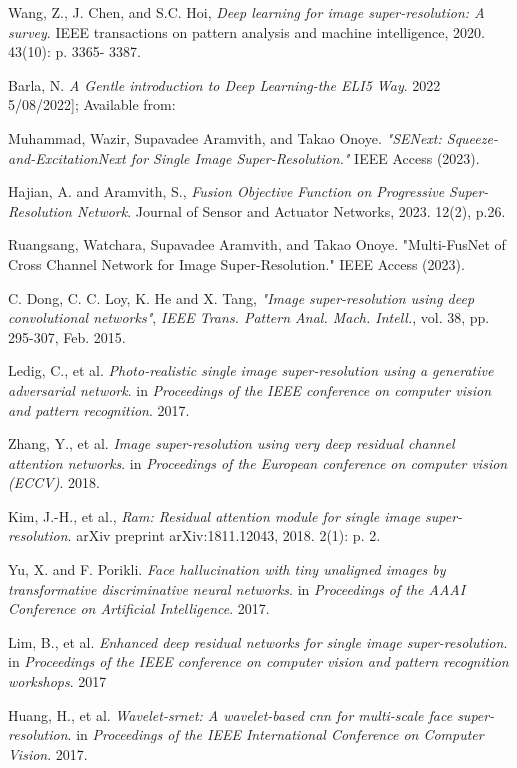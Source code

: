 \documentclass{ieeeaccess}
\begin{document}
\begin{thebibliography}{00}
 Wang, Z., J. Chen, and S.C. Hoi, \textit{Deep learning for image super-resolution: A survey}. IEEE transactions on pattern analysis and machine intelligence, 2020. 43(10): p. 3365- 3387.

 Barla, N. \textit{A Gentle introduction to Deep Learning-the ELI5 Way}. 2022 5/08/2022]; Available from:

 Muhammad, Wazir, Supavadee Aramvith, and Takao Onoye. \textit{"SENext: Squeeze-and-ExcitationNext for Single Image Super-Resolution." }IEEE Access (2023).

 Hajian, A. and Aramvith, S.,  \textit{Fusion Objective Function on Progressive Super-Resolution Network}. Journal of Sensor and Actuator Networks, 2023. 12(2), p.26.

 Ruangsang, Watchara, Supavadee Aramvith, and Takao Onoye. "Multi-FusNet of Cross Channel Network for Image Super-Resolution." IEEE Access (2023).

 C. Dong, C. C. Loy, K. He and X. Tang, \textit{"Image super-resolution using deep convolutional networks"}, \textit{IEEE Trans. Pattern Anal. Mach. Intell.}, vol. 38, pp. 295-307, Feb. 2015.

 Ledig, C., et al. \textit{Photo-realistic single image super-resolution using a generative adversarial network}. in \textit{Proceedings of the IEEE conference on computer vision and pattern recognition}. 2017.

 Zhang, Y., et al. \textit{Image super-resolution using very deep residual channel attention networks}. in \textit{Proceedings of the European conference on computer vision (ECCV)}. 2018.

 Kim, J.-H., et al., \textit{Ram: Residual attention module for single image super-resolution}. arXiv preprint arXiv:1811.12043, 2018. 2(1): p. 2.

 Yu, X. and F. Porikli. \textit{Face hallucination with tiny unaligned images by transformative discriminative neural networks}. in \textit{Proceedings of the AAAI Conference on Artificial Intelligence}. 2017.

 Lim, B., et al. \textit{Enhanced deep residual networks for single image super-resolution}. in \textit{Proceedings of the IEEE conference on computer vision and pattern recognition workshops}. 2017

 Huang, H., et al. \textit{Wavelet-srnet: A wavelet-based cnn for multi-scale face super-resolution}. in \textit{Proceedings of the IEEE International Conference on Computer Vision}. 2017.


\end{thebibliography}
\end{document}
